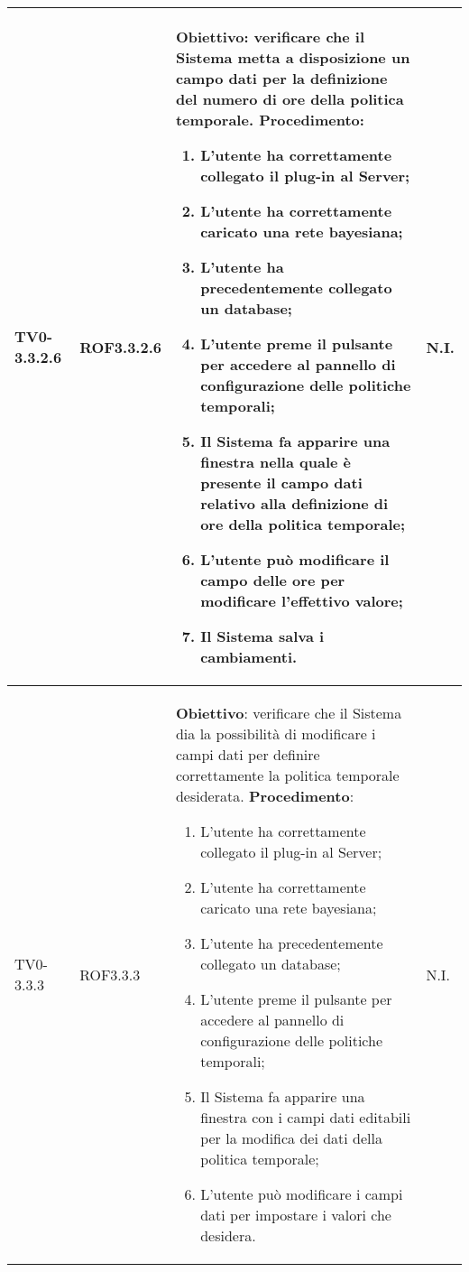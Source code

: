 \begin{longtable}{|C{.15\textwidth}|C{.13\textwidth}|m{.65\textwidth}|C{.08\textwidth}|}
TV0-3.3.2.6 & ROF3.3.2.6 &
	\textbf{Obiettivo}: verificare che il Sistema metta a disposizione un campo dati per la definizione del numero di ore della politica temporale. \newline
	\textbf{Procedimento}:
	\begin{enumerate}
		\item L'utente ha correttamente collegato il plug-in al Server;
		\item L'utente ha correttamente caricato una rete bayesiana;
		\item L'utente ha precedentemente collegato un database;
		\item L'utente preme il pulsante per accedere al pannello di configurazione delle politiche temporali;
		\item Il Sistema fa apparire una finestra nella quale è presente il campo dati relativo alla definizione di ore della politica temporale;
		\item L'utente può modificare il campo delle ore per modificare l'effettivo valore;
		\item Il Sistema salva i cambiamenti.
	\end{enumerate}
	& N.I. \\
\hline

TV0-3.3.3 & ROF3.3.3 &
	\textbf{Obiettivo}: verificare che il Sistema dia la possibilità di modificare i campi dati per definire correttamente la politica temporale desiderata. \newline
	\textbf{Procedimento}:
	\begin{enumerate}
		\item L'utente ha correttamente collegato il plug-in al Server;
		\item L'utente ha correttamente caricato una rete bayesiana;
		\item L'utente ha precedentemente collegato un database;
		\item L'utente preme il pulsante per accedere al pannello di configurazione delle politiche temporali;
		\item Il Sistema fa apparire una finestra con i campi dati editabili per la modifica dei dati della politica temporale;
		\item L'utente può modificare i campi dati per impostare i valori che desidera.
	\end{enumerate}
	& N.I. \\
\hline


\end{longtable}
